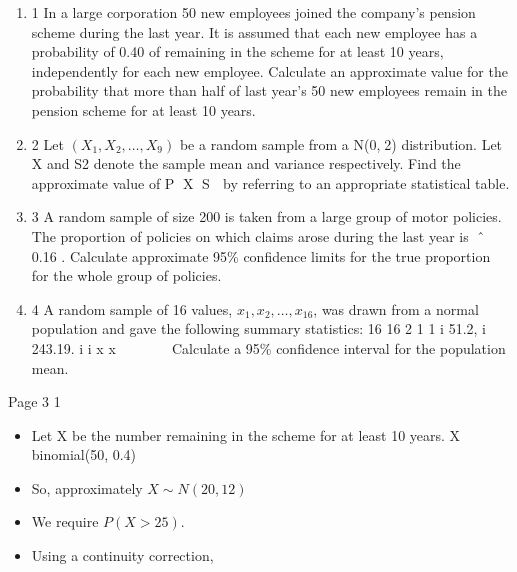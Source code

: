\documentclass[a4paper,12pt]{article}
\begin{document}
\begin{enumerate}
\item

1 In a large corporation 50 new employees joined the company’s pension scheme
during the last year. It is assumed that each new employee has a probability of 0.40
of remaining in the scheme for at least 10 years, independently for each new
employee.
Calculate an approximate value for the probability that more than half of last year’s
50 new employees remain in the pension scheme for at least 10 years. 
\item 2 Let $(X_1, X_2, … , X_9)$ be a random sample from a N(0,2) distribution. Let X and
S2 denote the sample mean and variance respectively.
Find the approximate value of P X  S  by referring to an appropriate statistical
table. 
\item 3 A random sample of size 200 is taken from a large group of motor policies. The
proportion of policies on which claims arose during the last year is ˆ  0.16 .
Calculate approximate 95\% confidence limits for the true proportion  for the whole
group of policies. 
\item 4 A random sample of 16 values, $x_1, x_2, \ldots , x_{16}$, was drawn from a normal population
and gave the following summary statistics:
16 16
2
1 1
i 51.2, i 243.19.
i i
x x
 
   
Calculate a 95\% confidence interval for the population mean. 

\end{enumerate}

Page 3
1 

\begin{itemize}
    \item Let X be the number remaining in the scheme for at least 10 years.
X ~ binomial(50, 0.4)
\item So, approximately $X \sim N(20, 12)$
\item We require $P(X > 25)$.
\item Using a continuity correction,
\end{itemize}
\end{document}
